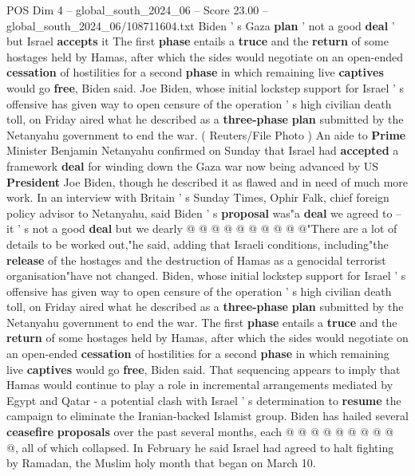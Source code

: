 \begin{textsample}{POS Dim 4 – global\_south\_2024\_06 – Score 23.00 – global\_south\_2024\_06/108711604.txt}  \label{ex:f4_pos_090}
Biden ' s Gaza \textbf{plan} ' not a good \textbf{deal} ' but Israel \textbf{accepts} it The first \textbf{phase} entails a \textbf{truce} and the \textbf{return} of some hostages held by Hamas, after which the sides would negotiate on an open-ended \textbf{cessation} of hostilities for a second \textbf{phase} in which remaining live \textbf{captives} would go \textbf{free}, Biden said.
Joe Biden, whose initial lockstep support for Israel ' s offensive has given way to open censure of the operation ' s high civilian death toll, on Friday aired what he described as a \textbf{three-phase} \textbf{plan} submitted by the Netanyahu government to end the war. ( Reuters/File Photo ) An aide to \textbf{Prime} Minister Benjamin Netanyahu confirmed on Sunday that Israel had \textbf{accepted} a framework \textbf{deal} for winding down the Gaza war now being advanced by US \textbf{President} Joe Biden, though he described it as flawed and in need of much more work.
In an interview with Britain ' s Sunday Times, Ophir Falk, chief foreign policy advisor to Netanyahu, said Biden ' s \textbf{proposal} was"a \textbf{deal} we agreed to -- it ' s not a good \textbf{deal} but we dearly @ @ @ @ @ @ @ @ @ @"There are a lot of details to be worked out,"he said, adding that Israeli conditions, including"the \textbf{release} of the hostages and the destruction of Hamas as a genocidal terrorist organisation"have not changed.
Biden, whose initial lockstep support for Israel ' s offensive has given way to open censure of the operation ' s high civilian death toll, on Friday aired what he described as a \textbf{three-phase} \textbf{plan} submitted by the Netanyahu government to end the war.
The first \textbf{phase} entails a \textbf{truce} and the \textbf{return} of some hostages held by Hamas, after which the sides would negotiate on an open-ended \textbf{cessation} of hostilities for a second \textbf{phase} in which remaining live \textbf{captives} would go \textbf{free}, Biden said.
That sequencing appears to imply that Hamas would continue to play a role in incremental arrangements mediated by Egypt and Qatar - a potential clash with Israel ' s determination to \textbf{resume} the campaign to eliminate the Iranian-backed Islamist group.
Biden has hailed several \textbf{ceasefire} \textbf{proposals} over the past several months, each @ @ @ @ @ @ @ @ @ @, all of which collapsed.
In February he said Israel had agreed to halt fighting by Ramadan, the Muslim holy month that began on March 10.

\end{textsample}
